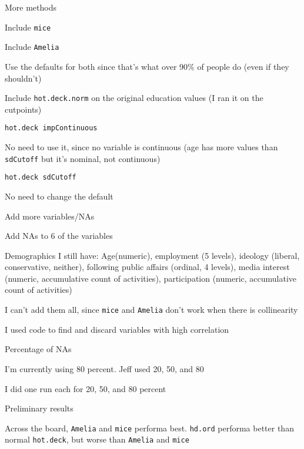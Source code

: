 \begin{coi}
		\item More methods
			\begin{coi}
				\item Include \texttt{mice}
				\item Include \texttt{Amelia}
				\item Use the defaults for both since that's what over 90\% of people do (even if they shouldn't)
				\item Include \texttt{hot.deck.norm} on the original education values (I ran it on the cutpoints)
			\end{coi}
		\item \texttt{hot.deck impContinuous}
			\begin{coi}
				\item No need to use it, since no variable is continuous (age has more values than \texttt{sdCutoff} but it's nominal, not continuous)
			\end{coi}
		\item \texttt{hot.deck sdCutoff}
			\begin{coi}
				\item No need to change the default
			\end{coi}
		\item Add more variables/NAs
			\begin{coi}
				\item Add NAs to 6 of the variables
				\item Demographics I still have: Age(numeric), employment (5 levels), ideology (liberal, conservative, neither), following public affairs (ordinal, 4 levels), media interest (numeric, accumulative count of activities), participation (numeric, accumulative count of activities)
				\item I can't add them all, since \texttt{mice} and \texttt{Amelia} don't work when there is collinearity
				\item I used code to find and discard variables with high correlation
			\end{coi}
		\item Percentage of NAs
			\begin{coi}
				\item I'm currently using 80 percent. Jeff used 20, 50, and 80
				\item I did one run each for 20, 50, and 80 percent
			\end{coi}
		\item Preliminary results
			\begin{coi}
				\item Across the board, \texttt{Amelia} and \texttt{mice} performa best. \texttt{hd.ord} performa better than normal \texttt{hot.deck}, but worse than \texttt{Amelia} and \texttt{mice}

\end{coi}
\end{coi}
